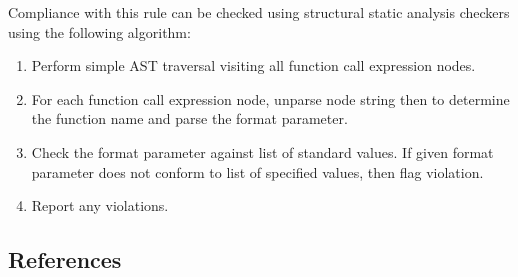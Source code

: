 Compliance with this rule can be checked using structural static analysis checkers using the following algorithm:

\begin{enumerate}
\item Perform simple AST traversal visiting all function call expression nodes.
\item For each function call expression node, unparse node string then to determine the function name and parse the format parameter.
\item Check the format parameter against list of standard values. If given format parameter does not conform to list of specified values, then flag violation.
\item Report any violations.
\end{enumerate}

\subsection{References}

